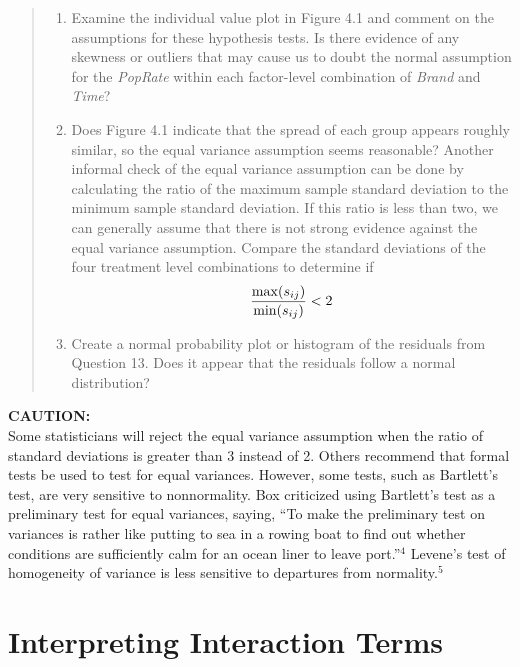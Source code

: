 \documentclass[
]{report}
\providecommand{\tightlist}{%
  \setlength{\itemsep}{0pt}\setlength{\parskip}{0pt}}
\begin{document}
\begin{quote}
\begin{enumerate}
\def\labelenumi{\alph{enumi}.}
\tightlist
\item
  Examine the individual value plot in Figure 4.1 and comment on the assumptions for these hypothesis tests. Is there evidence of any skewness or outliers that may cause us to doubt the normal assumption for the \emph{PopRate} within each factor-level combination of \emph{Brand} and \emph{Time}?
\item
  Does Figure 4.1 indicate that the spread of each group appears roughly similar, so the equal variance assumption seems reasonable? Another informal check of the equal variance assumption can be done by calculating the ratio of the maximum sample standard deviation to the minimum sample standard deviation. If this ratio is less than two, we can generally assume that there is not strong evidence against the equal variance assumption. Compare the standard deviations of the four treatment level combinations to determine if
  \begin{align}
  \frac{\max(s_{ij})}{\min(s_{ij})} < 2
  \notag
  \end{align}
\item
  Create a normal probability plot or histogram of the residuals from Question 13. Does it appear that the residuals follow a normal distribution?
\end{enumerate}
\end{quote}

\large

\textbf{CAUTION:}\\
Some statisticians will reject the equal variance assumption when the ratio of standard deviations is greater than 3 instead of 2. Others recommend that formal tests be used to test for equal variances. However, some tests, such as Bartlett's test, are very sensitive to nonnormality. Box criticized using Bartlett's test as a preliminary test for equal variances, saying, ``To make the preliminary test on variances is rather like putting to sea in a rowing boat to find out whether conditions are sufficiently calm for an ocean liner to leave port.''\(^4\) Levene's test of homogeneity of variance is less sensitive to departures from normality.\(^5\)
\normalsize

\hypertarget{interpreting-interaction-terms}{%
\section*{Interpreting Interaction Terms}\label{interpreting-interaction-terms}}
\end{document}
